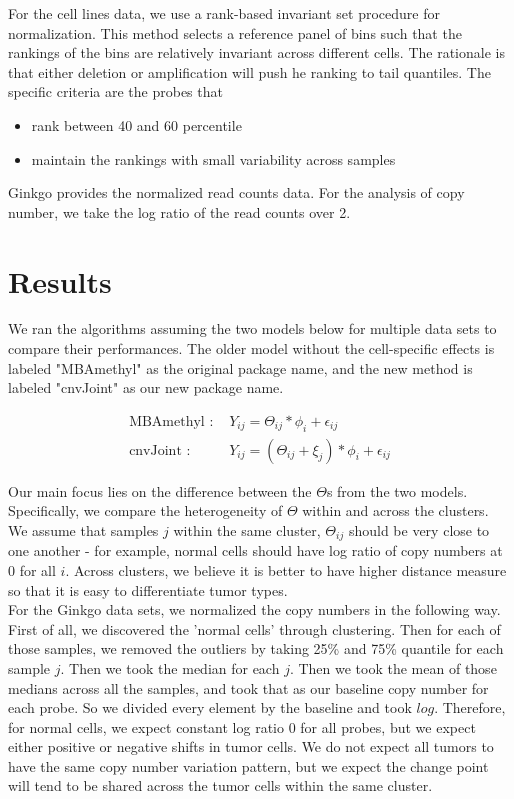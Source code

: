 \documentclass[11pt]{article}
\begin{document}
\noindent For the cell lines data, we use a rank-based invariant set procedure for normalization. This method selects a reference panel of bins such that the rankings of the bins are relatively invariant across different cells. The rationale is that either deletion or amplification will push he ranking to tail quantiles. The specific criteria are the probes that
\begin{itemize}
\item rank between 40 and 60 percentile
\item maintain the rankings with small variability across samples
\end{itemize}


\noindent Ginkgo provides the normalized read counts data. For the analysis of copy number, we take the log ratio of the read counts over 2. \\

\section{Results}
\noindent We ran the algorithms assuming the two models below for multiple data sets to compare their performances. The older model without the cell-specific effects is labeled "MBAmethyl" as the original package name, and the new method is labeled "cnvJoint" as our new package name. 

\begin{align*}
\text{MBAmethyl : }&Y_{ij} = \Theta_{ij} * \phi_i + \epsilon_{ij}\\
\text{cnvJoint : }&Y_{ij} = (\Theta_{ij} + \xi_j)*\phi_i + \epsilon_{ij}
\end{align*}

\noindent Our main focus lies on the difference between the $\Theta$s from the two models. Specifically, we compare the heterogeneity of $\Theta$ within and across the clusters. We assume that samples $j$ within the same cluster, $\Theta_{ij}$ should be very close to one another - for example, normal cells should have log ratio of copy numbers at 0 for all $i$. Across clusters, we believe it is better to have higher distance measure so that it is easy to differentiate tumor types. \\


\noindent For the Ginkgo data sets, we normalized the copy numbers in the following way. First of all, we discovered the 'normal cells' through clustering. Then for each of those samples, we removed the outliers by taking 25\% and 75\% quantile for each sample $j$. Then we took the median for each $j$. Then we took the mean of those medians across all the samples, and took that as our baseline copy number for each probe. So we divided every element by the baseline and took $log$. Therefore, for normal cells, we expect constant log ratio 0 for all probes, but we expect either positive or negative shifts in tumor cells. We do not expect all tumors to have the same copy number variation pattern, but we expect the change point will tend to be shared across the tumor cells within the same cluster.\\
\end{document}

